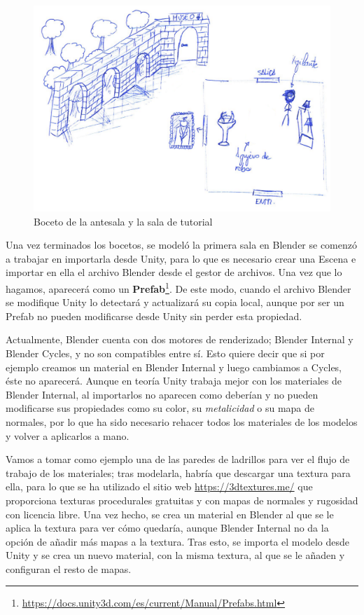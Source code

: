 \begin{figure}[!h]
\begin{center}
\includegraphics[width=.8\textwidth]{imagenes/7/bocetos/boceto-sala-0-1.png}
\caption{Boceto de la antesala y la sala de tutorial}
\label{fig:bocetos-salas-0-1}
\end{center}
\end{figure}

Una vez terminados los bocetos, se modeló la primera sala en Blender se comenzó a trabajar en importarla desde Unity, para lo que es necesario crear una Escena e importar en ella el archivo Blender desde el gestor de archivos. Una vez que lo hagamos, aparecerá como un \textbf{Prefab}\footnote{\url{https://docs.unity3d.com/es/current/Manual/Prefabs.html}}. De este modo, cuando el archivo Blender se modifique Unity lo detectará y actualizará su copia local, aunque por ser un Prefab no pueden modificarse desde Unity sin perder esta propiedad.

Actualmente, Blender cuenta con dos motores de renderizado; Blender Internal y Blender Cycles, y no son compatibles entre sí. Esto quiere decir que si por ejemplo creamos un material en Blender Internal y luego cambiamos a Cycles, éste no aparecerá. Aunque en teoría Unity trabaja mejor con los materiales de Blender Internal, al importarlos no aparecen como deberían y no pueden modificarse sus propiedades como su color, su \textit{metalicidad} o su mapa de normales, por lo que ha sido necesario rehacer todos los materiales de los modelos y volver a aplicarlos a mano.

Vamos a tomar como ejemplo una de las paredes de ladrillos para ver el flujo de trabajo de los materiales; tras modelarla, habría que descargar una textura para ella, para lo que se ha utilizado el sitio web \url{https://3dtextures.me/} que proporciona texturas procedurales gratuitas y con mapas de normales y rugosidad con licencia libre. Una vez hecho, se crea un material en Blender al que se le aplica la textura para ver cómo quedaría, aunque Blender Internal no da la opción de añadir más mapas a la textura. Tras esto, se importa el modelo desde Unity y se crea un nuevo material, con la misma textura, al que se le añaden y configuran el resto de mapas.

